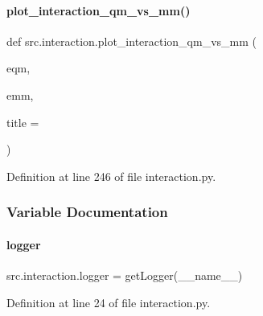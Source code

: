 \paragraph{\texorpdfstring{plot\+\_\+interaction\+\_\+qm\+\_\+vs\+\_\+mm()}{plot\_interaction\_qm\_vs\_mm()}}
{\footnotesize\ttfamily def src.\+interaction.\+plot\+\_\+interaction\+\_\+qm\+\_\+vs\+\_\+mm (\begin{DoxyParamCaption}\item[{}]{eqm,  }\item[{}]{emm,  }\item[{}]{title = {\ttfamily \textquotesingle{}\textquotesingle{}} }\end{DoxyParamCaption})}



Definition at line 246 of file interaction.\+py.



\subsubsection{Variable Documentation}
\mbox{\label{namespacesrc_1_1interaction_a34764f82b89cffff442e96b4331f038f}} 
\paragraph{\texorpdfstring{logger}{logger}}
{\footnotesize\ttfamily src.\+interaction.\+logger = get\+Logger(\+\_\+\+\_\+name\+\_\+\+\_\+)}



Definition at line 24 of file interaction.\+py.

